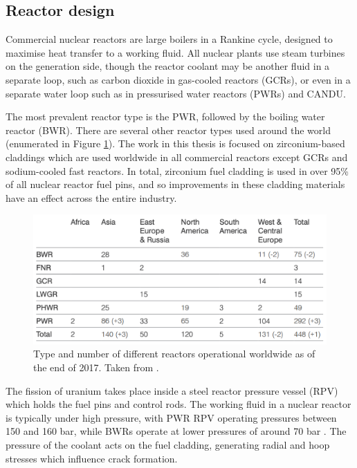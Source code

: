 \subsection{Reactor design} %

Commercial nuclear reactors are large boilers in a Rankine cycle, designed to maximise heat transfer to a working fluid. All nuclear plants use steam turbines on the generation side, though the reactor coolant may be another fluid in a separate loop, such as carbon dioxide in gas-cooled reactors (GCRs), or even in a separate water loop such as in pressurised water reactors (PWRs) and CANDU. 

The most prevalent reactor type is the PWR, followed by the boiling water reactor (BWR). There are several other reactor types used around the world (enumerated in Figure \ref{figure:world_reactors}). The work in this thesis is focused on zirconium-based claddings which are used worldwide in all commercial reactors except GCRs and sodium-cooled fast reactors. In total, zirconium fuel cladding is used in over 95\% of all nuclear reactor fuel pins, and so improvements in these cladding materials have an effect across the entire industry.

\begin{figure}[htp] %
\centering
\includegraphics[width=15cm]{images/WNA_report2018.png}
\caption[Type and number of different reactors operational worldwide as of the end of 2017.]{Type and number of different reactors operational worldwide as of the end of 2017. Taken from \cite{WNAreport2018}.}
\label{figure:world_reactors}
\end{figure}

The fission of uranium takes place inside a steel reactor pressure vessel (RPV) which holds the fuel pins and control rods. The working fluid in a nuclear reactor is typically under high pressure, with PWR RPV operating pressures between 150 and 160 bar, while BWRs operate at lower pressures of around 70 bar \cite{kok2016nuclear, Server2010, Durmayaz2001}. The pressure of the coolant acts on the fuel cladding, generating radial and hoop stresses which influence crack formation. 

